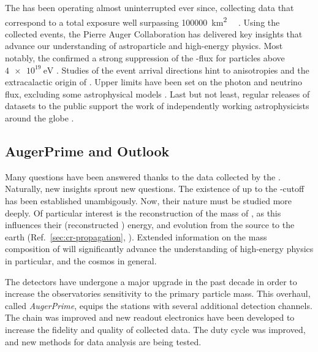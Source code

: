 The \PAO has been operating almost uninterrupted ever since, collecting data 
that correspond to a total exposure well surpassing 
\SI{100000}{\km\squared\sr\year} \cite{aabPierreAugerObservatory2020}. Using
the collected events, the Pierre Auger Collaboration has delivered key insights
that advance our understanding of astroparticle and high-energy physics. Most 
notably, the \PAO confirmed a strong suppression of the \CR-flux for particles 
above $\SI{4e19}{\eV}$ \cite{yamamotoUHECRSpectrumMeasured2007}. Studies of the
event arrival directions hint to anisotropies and the extracalactic origin of 
\UHECRs \cite{thepierreaugercollaborationObservationLargescaleAnisotropy2017}.
Upper limits have been set on the \UHE photon and neutrino flux, excluding some
astrophysical models \cite{collaborationPierreAugerObservatory2011, 
abreuSearchUltrahighEnergy2011}. Last but not least, regular releases of 
datasets to the public support the work of independently working 
astrophysicists around the globe \cite{zavrtanikPierreAugerObservatory2025}.

\subsection{AugerPrime and Outlook}
\label{ssec:augerprime-and-outlook}

Many questions have been answered thanks to the data collected by the \PAO. 
Naturally, new insights sprout new questions. The existence of \UHECRs up to
the \GZK-cutoff has been established unambigously. Now, their nature must be 
studied more deeply. Of particular interest is the reconstruction of the mass
of \UHECRs, as this influences their (reconstructed 
\cite{yushkovMassCompositionCosmic2021}) energy, and evolution from the source
to the earth (Ref.\ \cref{sec:cr-propagation}, 
\cite{strongCosmicRayPropagationInteractions2007, 
flaggsStudyingMassSensitivity2024}). Extended information on the mass 
composition of \CRs will significantly advance the understanding of high-energy
physics in particular, and the cosmos in general.

The \PAO detectors have undergone a major upgrade in the past decade in order 
to increase the observatories sensitivity to the primary particle mass. This 
overhaul, called \textit{AugerPrime}, equips the \SD stations with several 
additional detection channels. The \DAQ chain was improved and new readout 
electronics have been developed to increase the fidelity and quality of 
collected data. The \FD duty cycle was improved, and new methods for data 
analysis are being tested.

